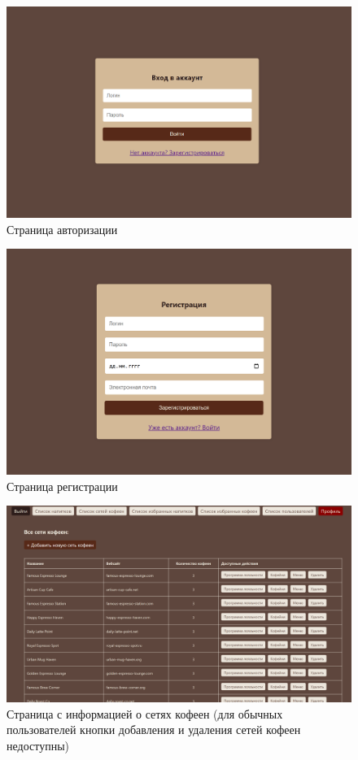 \begin{figure}[H]
	\centering
	\includegraphics[width=1\linewidth]{img/interface/login.png}
	\caption{Страница авторизации}
	\label{login}
\end{figure}

\begin{figure}[H]
	\centering
	\includegraphics[width=1\linewidth]{img/interface/register.png}
	\caption{Страница регистрации}
	\label{register}
\end{figure}

\begin{figure}[H]
	\centering
	\includegraphics[width=1\linewidth]{img/interface/getallcompanies_admin.png}
	\caption{Страница с информацией о сетях кофеен (для обычных пользователей кнопки добавления и удаления сетей кофеен недоступны)}
	\label{getallcompanies}
\end{figure}

